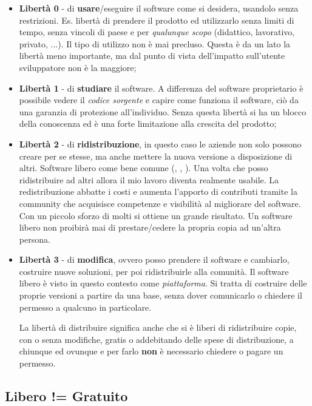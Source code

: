 \begin{itemize}

\item \textbf{Libertà 0} - di \textbf{usare}/eseguire il software come si desidera, usandolo senza restrizioni. Es. libertà di prendere il prodotto ed utilizzarlo senza limiti di tempo, senza vincoli di paese e per \textit{qualunque scopo} (didattico, lavorativo, privato, ...). Il tipo di utilizzo non è mai precluso. Questa è da un lato la libertà meno importante, ma dal punto di vista dell'impatto sull'utente sviluppatore non è la maggiore;
\item \textbf{Libertà 1} - di \textbf{studiare} il software. A differenza del software proprietario è possibile vedere il \textit{codice sorgente} e capire come funziona il software, ciò da una garanzia di protezione all'individuo. Senza questa libertà si ha un blocco della conoscenza ed è una forte limitazione alla crescita del prodotto;
\item \textbf{Libertà 2} - di \textbf{ridistribuzione}, in questo caso le aziende non solo possono creare per se stesse, ma anche mettere la nuova versione a disposizione di altri. Software libero come bene comune (, , ). Una volta che posso ridistribuire ad altri allora il mio lavoro diventa realmente usabile. La redistribuzione abbatte i costi e aumenta l'apporto di contributi tramite la community che acquisisce competenze e visibilità al migliorare del software. Con un piccolo sforzo di molti si ottiene un grande risultato. Un software libero non proibirà mai di prestare/cedere la propria copia ad un'altra persona.
\item \textbf{Libertà 3} - di \textbf{modifica}, ovvero posso prendere il software e cambiarlo, costruire nuove soluzioni, per poi ridistribuirle alla comunità. Il software libero è visto in questo contesto come \textit{piattaforma}. Si tratta di costruire delle proprie versioni a partire da una base, senza dover comunicarlo o chiedere il permesso a qualcuno in particolare.

La libertà di distribuire significa anche che si è liberi di ridistribuire copie, con o senza modifiche, gratis o addebitando delle spese di distribuzione, a chiunque ed ovunque e per farlo \textbf{non} è necessario chiedere o pagare un permesso.


\end{itemize}

\subsection{Libero != Gratuito}

